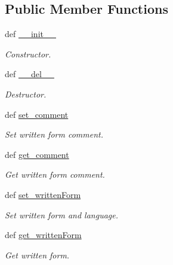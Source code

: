\subsection*{Public Member Functions}
\begin{DoxyCompactItemize}
\item 
def \hyperlink{classlmf_1_1src_1_1core_1_1text__representation_1_1_text_representation_a44896bbde1027d1156df6f3c6396a117}{\+\_\+\+\_\+init\+\_\+\+\_\+}
\begin{DoxyCompactList}\small\item\em Constructor. \end{DoxyCompactList}\item 
def \hyperlink{classlmf_1_1src_1_1core_1_1text__representation_1_1_text_representation_aca36ddfaa299552d8248fd6ce08202a1}{\+\_\+\+\_\+del\+\_\+\+\_\+}
\begin{DoxyCompactList}\small\item\em Destructor. \end{DoxyCompactList}\item 
def \hyperlink{classlmf_1_1src_1_1core_1_1text__representation_1_1_text_representation_a84a6b65581f2e327a47989912c33838a}{set\+\_\+comment}
\begin{DoxyCompactList}\small\item\em Set written form comment. \end{DoxyCompactList}\item 
def \hyperlink{classlmf_1_1src_1_1core_1_1text__representation_1_1_text_representation_a3211a3da3b34f68aa4d6542aafe940ee}{get\+\_\+comment}
\begin{DoxyCompactList}\small\item\em Get written form comment. \end{DoxyCompactList}\item 
def \hyperlink{classlmf_1_1src_1_1core_1_1text__representation_1_1_text_representation_a6ecc8173f69656c0135368ded971ceea}{set\+\_\+written\+Form}
\begin{DoxyCompactList}\small\item\em Set written form and language. \end{DoxyCompactList}\item 
def \hyperlink{classlmf_1_1src_1_1core_1_1text__representation_1_1_text_representation_a85adf686ca1d5df10588f312260390e9}{get\+\_\+written\+Form}
\begin{DoxyCompactList}\small\item\em Get written form. \end{DoxyCompactList}\item 

\end{DoxyCompactItemize}
